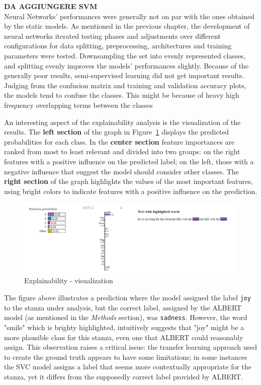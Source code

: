 \textbf{DA AGGIUNGERE SVM}\\

Neural Networks' performances were generally not on par with the ones obtained by
the static models.
As mentioned in the previous chapter, the development of neural networks
iterated testing phases and adjustments over different configurations for data
splitting, preprocessing, architectures and training parameters were tested.
Downsampling the set into evenly represented classes, and splitting evenly
improves the models' performances slightly.
Because of the generally poor results, semi-supervised learning did not get
important results.
Judging from the confusion matrix %
and training and validation accuracy plots, the models tend to confuse the classes.
This might be because of heavy high frequency overlapping terms between the classes


An interesting aspect of the explainability analysis is the visualization of the results.
The \textbf{left section} of the graph in Figure~\ref{fig:expl} displays the predicted probabilities for each class. In the \textbf{center section}
feature importances are ranked from most to least relevant and divided into two groups: on the right
features with a positive influence on the predicted label; on the left, those with a negative influence that suggest the model should consider other classes.
The \textbf{right section} of the graph highlights the values of the most important
features, using bright colors to indicate features with a positive influence on the prediction.

\begin{figure}[H]
    \centering
    \includegraphics[scale= 0.55]{pictures/expl.png}
    \caption{Explainability - visualization}
    \label{fig:expl}
\end{figure}

The figure above illustrates a prediction where the model assigned the label \texttt{joy} to the stanza under analysis, but the correct label, assigned by the ALBERT model (as mentioned in the \textit{Methods} section), was \texttt{sadness}.
However, the word "smile" which is brighty highlighted, intuitively suggests that "joy" might be a more plausible class for this stanza, even one that ALBERT could reasonably assign. 
This observation raises a critical issue: the transfer learning approach used to create the ground truth appears to have some limitations; in some instances the SVC model assigns a label that seems more contextually appropriate for the stanza, 
yet it differs from the supposedly correct label provided by ALBERT.
